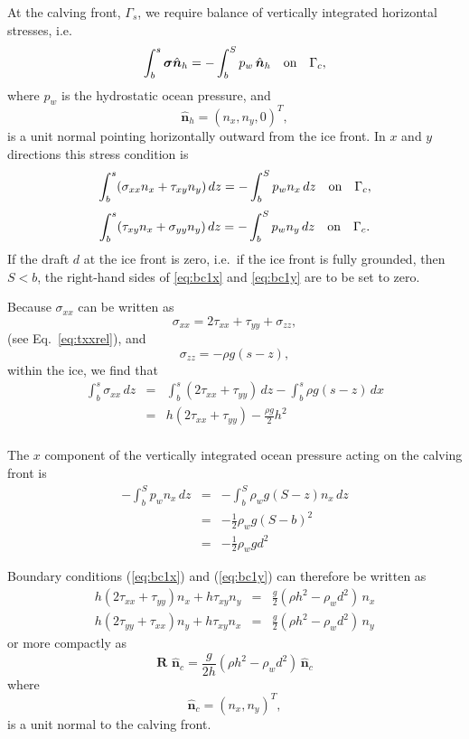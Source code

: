 \documentclass[10pt,a4paper]{book}
\newcommand{\txx}{\tau_{xx}}
\newcommand{\tyy}{\tau_{yy}}
\newcommand{\txy}{\tau_{xy}}
\newcommand{\sxx}{\sigma_{xx}}
\newcommand{\syy}{\sigma_{yy}}
\newcommand{\szz}{\sigma_{zz}}
\newcommand{\normalh}{\hat{\bm{n}}_h}
\newcommand{\normalc}{\hat{\bm{n}}_{c}}
\begin{document}
\label{sec:bccalving}
At the calving front, $\Gamma_s$, we require balance of vertically integrated horizontal stresses, i.e.\
\[
\int_b^s \bm{\sigma}  \normalh = - \int_b^S p_w \, \normalh  \quad \hbox{on} \quad \Gamma_c ,
\]
where $p_w$ is the hydrostatic ocean pressure, and
\begin{equation}
\normalh=(n_x,n_y,0)^T ,
\label{eq:normalh}
\end{equation}
is a unit normal pointing horizontally
outward from the ice front.  In $x$ and $y$ directions this stress condition  is
\begin{equation}
 \int_b^s ( \sxx n_x + \txy n_y) \, dz = -\int_b^S  p_w n_x \, dz  \quad \hbox{on} \quad \Gamma_c ,
\label{eq:bc1x}
\end{equation}
\begin{equation}
  \int_b^s (\txy n_x + \syy n_y) \, dz = -\int_b^S p_w n_y \, dz \quad \hbox{on} \quad \Gamma_c .
\label{eq:bc1y}
\end{equation}
If the draft $d$ at the ice front is zero,
i.e.\ if the ice front is fully grounded, then $S<b$, the right-hand
sides of \eqref{eq:bc1x} and \eqref{eq:bc1y} are to be set to zero.

Because $\sxx$ can be written as
\[ \sxx=2 \txx +\tyy + \szz ,\]
(see Eq.~\ref{eq:txxrel}), and 
\[ \szz=-\rho g (s-z) ,\]
within the ice, we find that
\begin{eqnarray*}
\int_b^s \sxx \, dz &=& \int_b^s (2 \txx + \tyy) \, dz - \int_b^s \rho g (s-z) \, dx \nonumber \\
                    &=& h (2 \txx + \tyy)  - \frac{\rho g}{2} h^2 \nonumber \\
\end{eqnarray*}

The $x$ component of the vertically integrated ocean pressure acting on the calving front is
\begin{eqnarray*}
-\int_b^S  p_w n_x \, dz &=& -\int_b^S  \rho_w g (S-z) n_x \, dz \\
&=& -\frac{1}{2} \rho_w g (S-b)^2 \\
&=& -\frac{1}{2} \rho_w g d^2
\end{eqnarray*}

Boundary conditions (\ref{eq:bc1x}) and (\ref{eq:bc1y}) can therefore be written as
\begin{eqnarray}
h (2 \txx + \tyy) n_x + h \txy n_y &=&  \frac{g}{2} (\rho h^2 - \rho_w  d^2)\, n_x \label{eq:bcgfx} \\
h (2 \tyy + \txx) n_y + h \txy n_x &=&  \frac{g}{2} (\rho h^2 - \rho_w  d^2)\, n_y \label{eq:bcgfy}
\end{eqnarray}
or more compactly as
\begin{equation}
\bm{R}\, \, \normalc=\frac{g}{2h} ( \rho h^2-\rho_w d^2) \, \normalc
\label{eq:BCCF}
\end{equation}
where
\begin{equation}
\normalc=(n_x,n_y)^T ,
\label{eq:normalc}
\end{equation}
is a unit normal to the calving front.
\end{document}
